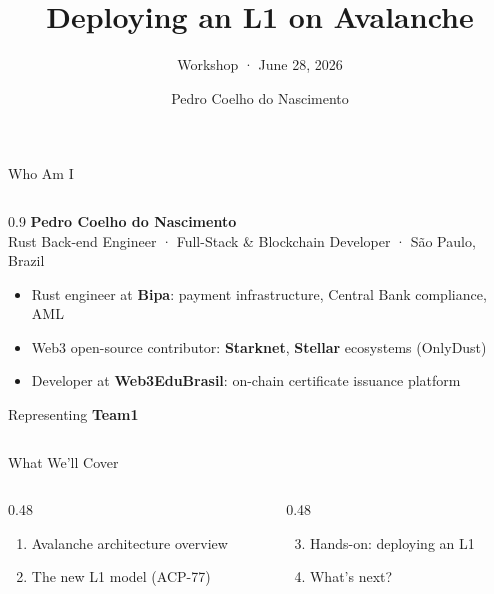 \documentclass[aspectratio=169]{beamer}
\title{Deploying an L1 on Avalanche}
\subtitle{Workshop · June 28, 2026}
\author{Pedro Coelho do Nascimento}
\institute{Team1}
\date{}
\begin{document}

\begin{frame}[plain]
	\titlepage
\end{frame}

\begin{frame}{Who Am I}
	\begin{columns}[c]
		\begin{column}{0.9\textwidth}
			{\large\textbf{Pedro Coelho do Nascimento}}\\[0.2em]
			{\small\textcolor{avagraydark}{Rust Back-end Engineer · Full-Stack \& Blockchain Developer · São Paulo, Brazil}}

			\vspace{0.8em}
			\begin{itemize}
				\item Rust engineer at \textbf{Bipa}: payment infrastructure, Central Bank compliance, AML
				\item Web3 open-source contributor: \textbf{Starknet}, \textbf{Stellar} ecosystems (OnlyDust)
				\item Developer at \textbf{Web3EduBrasil}: on-chain certificate issuance platform
			\end{itemize}

			\vspace{0.8em}
			{\small Representing \textbf{Team1}}
		\end{column}
	\end{columns}
\end{frame}

\begin{frame}{What We'll Cover}
	\begin{columns}[t]
		\begin{column}{0.48\textwidth}
			\begin{enumerate}
				\item Avalanche architecture overview
				\item The new L1 model (ACP-77)
			\end{enumerate}
		\end{column}
		\begin{column}{0.48\textwidth}
			\begin{enumerate}
				\setcounter{enumi}{2}
				\item Hands-on: deploying an L1
				\item What's next?
			\end{enumerate}
		\end{column}
	\end{columns}
\end{frame}
\end{document}
